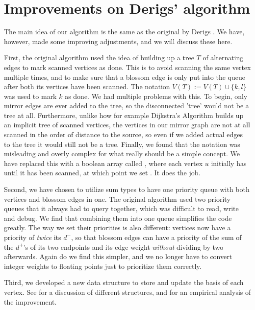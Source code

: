 \section{Improvements on Derigs' algorithm}
The main idea of our algorithm is the same as the original by Derigs \cite{source:derigs_shortest_odd_path}. We have, however, made some improving adjustments, and we will discuss these here.

First, the original algorithm used the idea of building up a tree $T$ of alternating edges to mark scanned vertices as done. This is to avoid scanning the same vertex multiple times, and to make sure that a blossom edge is only put into the queue after both its vertices have been scanned. The notation $V(T) := V(T) \cup \{k,l\}$ was used to mark $k$ as done. We had multiple problems with this. To begin, only mirror edges are ever added to the tree, so the disconnected 'tree' would not be a tree at all. Furthermore, unlike how for example Dijkstra's Algorithm builds up an implicit tree of scanned vertices, the vertices in our mirror graph are not at all scanned in the order of distance to the source, so even if we added actual edges to the tree it would still not be a tree. Finally, we found that the notation was misleading and overly complex for what really should be a simple concept. We have replaced this with a boolean array called , where each vertex $u$ initially has  until it has been scanned, at which point we set . It does the job.

Second, we have chosen to utilize sum types to have one priority queue with both vertices and blossom edges in one. The original algorithm used two priority queues that it always had to query together, which was difficult to read, write and debug. We find that combining them into one queue simplifies the code greatly. The way we set their priorities is also different: vertices now have a priority of \emph{twice} its $d^-$, so that blossom edges can have a priority of the sum of the $d^+$'s of its two endpoints and its edge weight \emph{without} dividing by two afterwards. Again do we find this simpler, and we no longer have to convert integer weights to floating points just to prioritize them correctly.

Third, we developed a new data structure to store and update the basis of each vertex. See  for a discussion of different structures, and  for an empirical analysis of the improvement.
